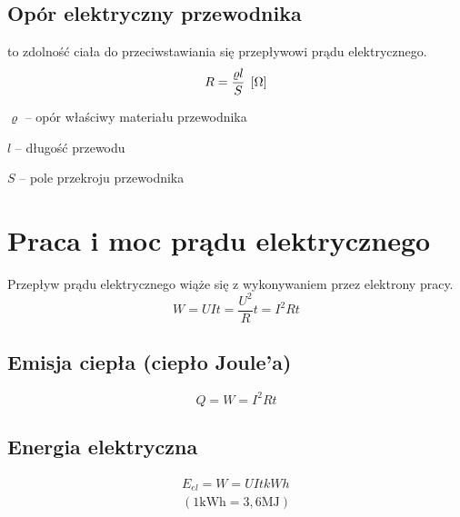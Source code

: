     \subsection{Opór elektryczny przewodnika}
      \begin{definition}
         to zdolność ciała do przeciwstawiania się przepływowi prądu elektrycznego.
        \begin{equation*}
          R = \frac{\varrho l}{S} \;\left[\mathrm{\Omega}\right]
        \end{equation*}
        \begin{symbols}
          \item $\varrho$ -- opór właściwy materiału przewodnika
          \item $l$ -- długość przewodu
          \item $S$ -- pole przekroju przewodnika
        \end{symbols}
      \end{definition}

  \section{Praca i moc prądu elektrycznego}
    Przepływ prądu elektrycznego wiąże się z wykonywaniem przez elektrony pracy.
    \begin{equation}\label{praca el}
      \boxed{W = UIt = \frac{U^2}{R}t = I^2Rt}
    \end{equation}

    \subsection{Emisja ciepła (ciepło Joule'a)}
      \begin{equation*}
        Q = W = I^2Rt
      \end{equation*}

    \subsection{Energia elektryczna}
      \begin{gather*}
        E_{el} = W = UIt \unit{kWh}\\
        (1\mathrm{kWh} = 3,6\mathrm{MJ})
      \end{gather*}

